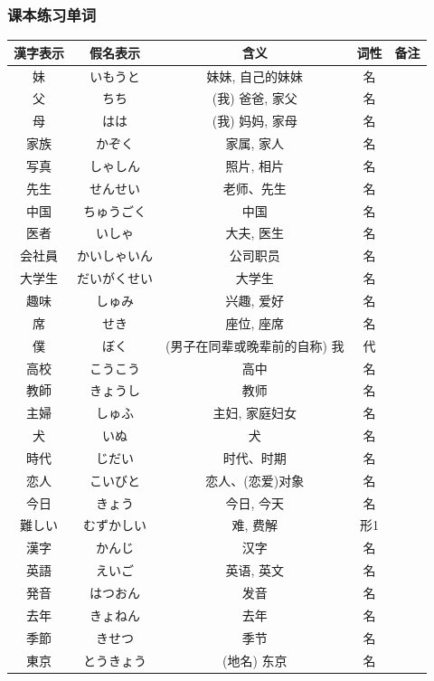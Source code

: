 \subsubsection{课本练习单词}
\begin{longtable}{|c|c|c|c|c|}
    \hline
漢字表示 & 假名表示  & 含义 & 词性 & 备注 \\ \hline\hline  
妹 & いもうと & 妹妹, 自己的妹妹 & 名 &  \\ \hline
父 & ちち & (我) 爸爸, 家父 & 名 &  \\ \hline
母 & はは & (我) 妈妈, 家母 & 名 &  \\ \hline
家族 & かぞく & 家属, 家人 & 名 &  \\ \hline
写真 & しゃしん & 照片, 相片 & 名 &  \\ \hline
先生 & せんせい & 老师、先生 & 名 &  \\ \hline
中国 & ちゅうごく & 中国 & 名 &  \\ \hline
医者 & いしゃ & 大夫, 医生 & 名 &  \\ \hline
会社員 & かいしゃいん & 公司职员 & 名 &  \\ \hline
大学生 & だいがくせい & 大学生 & 名 &  \\ \hline
趣味 & しゅみ & 兴趣, 爱好 & 名 &  \\ \hline
席 & せき & 座位, 座席 & 名 &  \\ \hline
僕 & ぼく & (男子在同辈或晚辈前的自称) 我 & 代 &  \\ \hline
高校 & こうこう & 高中 & 名 &  \\ \hline
教師 & きょうし & 教师 & 名 &  \\ \hline
主婦 & しゅふ & 主妇, 家庭妇女 & 名 &  \\ \hline
犬 & いぬ & 犬 & 名 &  \\ \hline
時代 & じだい & 时代、时期 & 名 &  \\ \hline
恋人 & こいびと & 恋人、(恋爱)对象 & 名 &  \\ \hline
今日 & きょう & 今日, 今天 & 名 &  \\ \hline
難しい & むずかしい & 难, 费解 & 形1 &  \\ \hline
漢字 & かんじ & 汉字 & 名 &  \\ \hline
英語 & えいご & 英语, 英文 & 名 &  \\ \hline
発音 & はつおん & 发音 & 名 &  \\ \hline
去年 & きょねん & 去年 & 名 &  \\ \hline
季節 & きせつ & 季节 & 名 &  \\ \hline
東京 & とうきょう & (地名) 东京 & 名 &  \\ \hline

\end{longtable}
